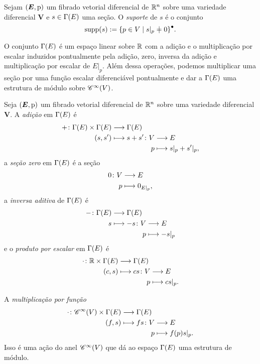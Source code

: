 \begin{definition}
Sejam $(\bm E,\mathrm{p})$ um fibrado vetorial diferencial de $\mathbb{R}^n$ sobre uma variedade diferencial $\bm V$ e $s \in \Gamma(E)$ uma seção. O \emph{suporte} de $s$ é o conjunto
	\begin{equation*}
	\supp (s) := \Fec{\set{p \in V}{s|_p \neq 0}}.
	\end{equation*}
\end{definition}

O conjunto $\Gamma(E)$ é um espaço linear sobre $\mathbb{R}$ com a adição e o multiplicação por escalar induzidos pontualmente pela adição, zero, inversa da adição e multiplicação por escalar de $E|_p$. Além dessa operações, podemos multiplicar uma seção por uma função escalar diferenciável pontualmente e dar a $\Gamma(E)$ uma estrutura de módulo sobre $\mathscr{C}^\infty(V)$.

\begin{definition}
Seja $(\bm E,\mathrm{p})$ um fibrado vetorial diferencial de $\mathbb{R}^n$ sobre uma variedade diferencial $\bm V$. A \emph{adição} em $\Gamma(E)$ é
	\begin{align*}
	\func{+}{\Sec(E) \times \Sec(E)}{\Sec(E)}{(s,s')}{
	\begin{aligned}[t]
	\func{s+s'}{V}{E}{p}{s|_p + s'|_p,}
	\end{aligned}
	}
	\end{align*}
a \emph{seção zero} em $\Gamma(E)$ é a seção
	\begin{align*}
	\func{0}{V}{E}{p}{0_{E|_p}},
	\end{align*}
a \emph{inversa aditiva} de $\Gamma(E)$ é
	\begin{align*}
	\func{-}{\Sec(E)}{\Sec(E)}{s}{
	\begin{aligned}[t]
	\func{-s}{V}{E}{p}{-s|_p}
	\end{aligned}
	}
	\end{align*}
e o \emph{produto por escalar} em $\Gamma(E)$ é
	\begin{align*}
	\func{\cdot}{\R \times \Sec(E)}{\Sec(E)}{(c,s)}{
	\begin{aligned}[t]
	\func{cs}{V}{E}{p}{cs|_p.}
	\end{aligned}
	}
	\end{align*}

A \emph{multiplicação por função}
	\begin{align*}
	\func{\cdot}{\Cont^\infty(V) \times \Sec(E)}{\Sec(E)}{(f,s)}{
		\begin{aligned}[t]
		\func{fs}{V}{E}{p}{f(p)s|_p.}
		\end{aligned}
	}
	\end{align*}
Isso é uma ação do anel $\mathscr{C}^\infty(V)$ que dá ao espaço $\Gamma(E)$ uma estrutura de módulo.
\end{definition}


